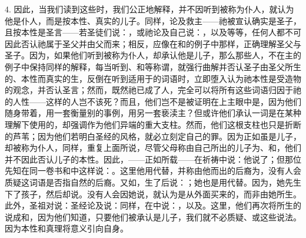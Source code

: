 4. 因此，当我们读到这些时，我们公正地解释，并不因听到被称为仆人，就认为他是仆人，而是按本性、真实的儿子。同样，论及救主——祂被宣认确实是圣子，且按本性是圣言——若圣徒们说：，或祂论及自己说：，以及等等，任何人都不可因此否认祂属于圣父并由父而来；相反，应像在和的例子中那样，正确理解圣父与圣子。因为，如果他们听到被称为仆人，却承认他是儿子，那么那些人，不在主的例子中保持同样的解释，每当听到、和等称谓，就强行曲解并否认圣子由圣父所生的、本性而真实的生，反倒在听到适用于的词语时，立即堕入认为祂本性是受造物的观念，并否认圣言；然而，既然祂已成了人，完全可以将所有这些词语归因于祂的人性——这样的人岂不该死？而且，他们岂不是被证明在上主眼中是，因为他们随身带着，用一套衡量别的事例，用另一套亵渎主？但或许他们承认一词是在某种理解下使用的，却强调作为他们异端的重大支柱。然而，他们这根支柱也只是折断的芦苇；因为他们若明白圣经的风格，就必立刻定自己的罪。因为正如虽是儿子，却被称为仆人，同样，重复上面所说，尽管父母称由自己所出的儿子为、和，他们并不因此否认儿子的本性。因此，——正如所载——在祈祷中说：他说了；但那位先知在同一卷书和中这样说：。这里他用代替，并称由他而出的后裔为，没有人会质疑这词语是否指自然的后裔。又如，生了后说：；她也是用代替。因为，她先生下了孩子，然后却说。没有人会因她说，就认为是从外面买来的，而非由她所生。此外，圣祖对说：圣经论及说：同样，在中说：，以及。这里，他们再次将所生的说成和，因为他们知道，只要他们被承认是儿子，我们就不必质疑、或这些说法。因为本性和真理将意义引向自身。\par

